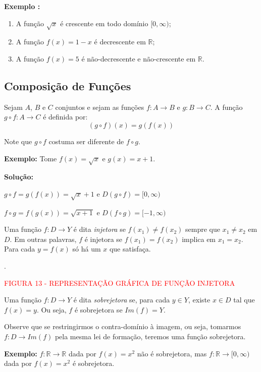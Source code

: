\documentclass[oneside,a4paper,12pt]{article}
\begin{document}
\textbf{Exemplo :}
\begin{enumerate}
	\item A função $\sqrt{x}$ é crescente em todo domínio $[0, \infty)$;
	\item A função $f(x) = 1 - x$ é decrescente em $\mathbb{R}$;
	\item A função $f(x) = 5$ é não-decrescente e não-crescente em $\mathbb{R}$.
\end{enumerate}


\subsection{Composição de Funções}

Sejam $A$, $B$ e $C$ conjuntos e sejam as funções $f:A \rightarrow B$ e $g: B \rightarrow C$. A função $ g \circ f : A \rightarrow C$ é definida por:
$$(g \circ f)(x) = g(f(x))$$

Note que $g \circ f$ costuma ser diferente de $ f \circ g$.

\textbf{Exemplo: } Tome $f(x) = \sqrt{x}$ e $g(x) = x + 1$.

{\bf Solução:}

$g \circ f = g(f(x)) = \sqrt{x}+1$ e $D(g \circ f) = [0,\infty)$

$f \circ g = f(g(x)) = \sqrt{x+1}$ e $D(f \circ g) = [-1,\infty)$

Uma função $f:D \rightarrow Y$ é dita {\it injetora} se $f(x_1) \neq f(x_2)$ sempre que $x_1 \neq x_2$ em $D$. Em outras palavras, $f$ é injetora se $f(x_1) = f(x_2)$ implica em $x_1 = x_2$. Para cada $y = f(x)$ só há um $x$ que satisfaça.


\vspace{150pt}
.
\begin{center}
	\textcolor{red}{FIGURA 13 - REPRESENTAÇÃO GRÁFICA DE FUNÇÃO INJETORA}
\end{center}

Uma função $f:D \rightarrow Y$ é dita {\it sobrejetora} se, para cada $y \in Y$, existe $x \in D$ tal que $f(x) = y$. Ou seja, $f$ é sobrejetora se $Im(f) = Y$.

Observe que se restringirmos o contra-domínio à imagem, ou seja, tomarmos $f: D \rightarrow Im(f)$ pela mesma lei de formação, teremos uma função sobrejetora.

\textbf{Exemplo: } $f: \mathbb{R} \rightarrow \mathbb{R}$ dada por $f(x) = x^2$ não é sobrejetora, mas $f: \mathbb{R} \rightarrow [0, \infty)$ dada por $f(x)=x^2$ é sobrejetora.
\end{document}
